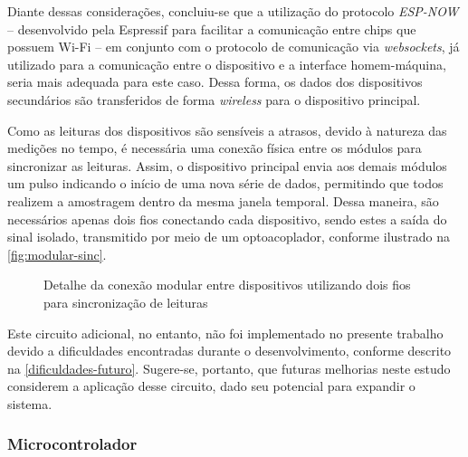 Diante dessas considerações, concluiu-se que a utilização do protocolo \textit{ESP-NOW} – desenvolvido pela Espressif para facilitar a comunicação entre chips que possuem Wi-Fi – em conjunto com o protocolo de comunicação via \textit{websockets}, já utilizado para a comunicação entre o dispositivo e a interface homem-máquina, seria mais adequada para este caso. Dessa forma, os dados dos dispositivos secundários são transferidos de forma \textit{wireless} para o dispositivo principal.

Como as leituras dos dispositivos são sensíveis a atrasos, devido à natureza das medições no tempo, é necessária uma conexão física entre os módulos para sincronizar as leituras. Assim, o dispositivo principal envia aos demais módulos um pulso indicando o início de uma nova série de dados, permitindo que todos realizem a amostragem dentro da mesma janela temporal. Dessa maneira, são necessários apenas dois fios conectando cada dispositivo, sendo estes a saída do sinal isolado, transmitido por meio de um optoacoplador, conforme ilustrado na \autoref{fig:modular-sinc}.

\begin{figure}[htb!]
    \caption{Detalhe da conexão modular entre dispositivos utilizando dois fios para sincronização de leituras}
    \label{fig:modular-sinc}
    \fonte{}
\end{figure}

Este circuito adicional, no entanto, não foi implementado no presente trabalho devido a dificuldades encontradas durante o desenvolvimento, conforme descrito na \autoref{dificuldades-futuro}. Sugere-se, portanto, que futuras melhorias neste estudo considerem a aplicação desse circuito, dado seu potencial para expandir o sistema.

\subsubsection{Microcontrolador}\label{uC-metodologia}

